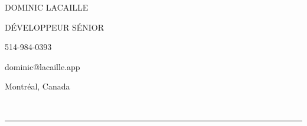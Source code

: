 \documentclass{article}
\begin{document}

\thispagestyle{empty}

\noindent
\begin{minipage}{12cm}
  \vspace{0.5em}
  {\fontsize{33}{33}\noindent\selectfont\avl\uppercase{Dominic Lacaille}\par}
  \vspace{1em}
  {\noindent\large\avul\uppercase{Développeur Sénior}\par}
\end{minipage}
\hfill
\begin{minipage}{4cm}
  {\faPhone*\hspace{1.5em}514-984-0393\par}
  \vspace{0.5em}
  {\faEnvelope\hspace{1.5em}dominic@lacaille.app\par}
  \vspace{0.5em}
  {\faCanadianMapleLeaf\hspace{1.5em}Montréal, Canada\par}
\end{minipage}

\

\par\noindent\rule{\textwidth}{0.4pt}

\vspace{3em}
\end{document}
